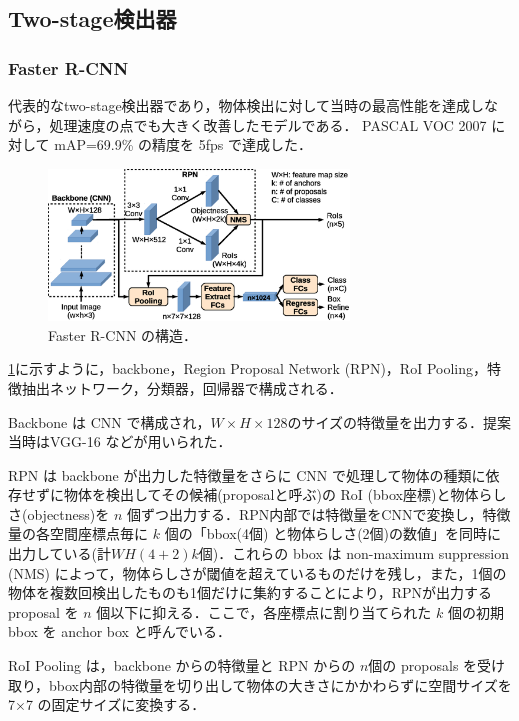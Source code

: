 \documentclass[originalpaper,fleqn]{jsaiart}     %
\begin{document}
\subsection{Two-stage検出器}
\subsubsection{Faster R-CNN}
代表的なtwo-stage検出器であり，物体検出に対して当時の最高性能を達成しながら，処理速度の点でも大きく改善したモデルである\cite{RHGS15}．
PASCAL VOC 2007 に対して mAP=69.9\% の精度を 5fps で達成した．
\begin{figure}[tb]
    \begin{center}
        \includegraphics[width=8cm,clip]{fig/archi_FasterRCNN.eps}
    \end{center}
    \caption{ Faster R-CNN の構造．}
    \label{fig:archi_FasterRCNN}
\end{figure}

 \ref{fig:archi_FasterRCNN}に示すように，backbone，Region Proposal Network (RPN)，RoI Pooling，特徴抽出ネットワーク，分類器，回帰器で構成される．

Backbone は CNN で構成され，$W{\times}H{\times}128$のサイズの特徴量を出力する．提案当時はVGG-16 \cite{SimZis15}などが用いられた．

RPN は backbone が出力した特徴量をさらに CNN で処理して物体の種類に依存せずに物体を検出してその候補(proposalと呼ぶ)の RoI (bbox座標)と物体らしさ(objectness)を $n$ 個ずつ出力する．RPN内部では特徴量をCNNで変換し，特徴量の各空間座標点毎に $k$ 個の「bbox(4個) と物体らしさ(2個)の数値」を同時に出力している(計$WH(4{+}2)k$個)．これらの bbox は non-maximum suppression (NMS) によって，物体らしさが閾値を超えているものだけを残し，また，1個の物体を複数回検出したものも1個だけに集約することにより，RPNが出力するproposal を $n$ 個以下に抑える．ここで，各座標点に割り当てられた $k$ 個の初期 bbox を anchor box と呼んでいる．

RoI Pooling は，backbone からの特徴量と RPN からの $n$個の proposals を受け取り，bbox内部の特徴量を切り出して物体の大きさにかかわらずに空間サイズを 7{$\times$}7 の固定サイズに変換する．
\end{document}
